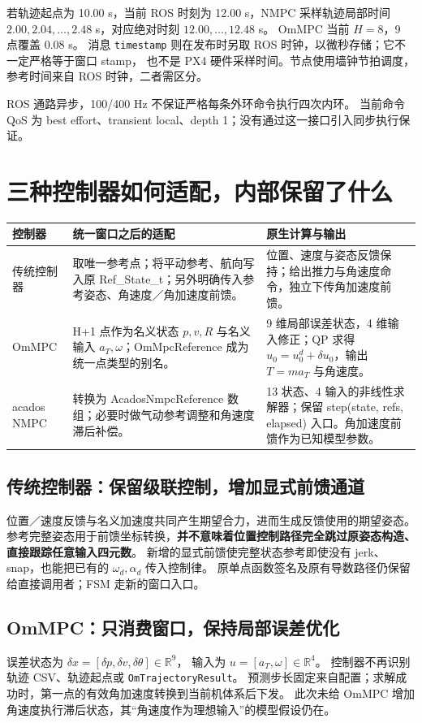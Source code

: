 \documentclass[UTF8,a4paper,11pt,fontset=fandol]{ctexart}
\newcommand{\code}[1]{{\small\nolinkurl{#1}}}
\begin{document}
若轨迹起点为 10.00 s，当前 ROS 时刻为 12.00 s，NMPC 采样轨迹局部时间
$2.00,2.04,\ldots,2.48$ s，对应绝对时刻 $12.00,\ldots,12.48$ s。
OmMPC 当前 $H=8$，9 点覆盖 0.08 s。
消息 \code{timestamp} 则在发布时另取 ROS 时钟，以微秒存储；它不一定严格等于窗口 stamp，
也不是 PX4 硬件采样时间。节点使用墙钟节拍调度，参考时间来自 ROS 时钟，二者需区分。

ROS 通路异步，100/400 Hz 不保证严格每条外环命令执行四次内环。
当前命令 QoS 为 best effort、transient local、depth 1；没有通过这一接口引入同步执行保证。
\clearpage

\section{三种控制器如何适配，内部保留了什么}
\label{sec:adapters}
\begin{table}[h!]
\centering\small
\begin{tabularx}{\linewidth}{L{2.2cm}L{4.2cm}Y}
\toprule
控制器 & 统一窗口之后的适配 & 原生计算与输出 \\\midrule
传统控制器 & 取唯一参考点；将平动参考、航向写入原 Ref\_State\_t；另外明确传入参考姿态、角速度／角加速度前馈。 & 位置、速度与姿态反馈保持；给出推力与角速度命令，独立下传角加速度前馈。\\
OmMPC & H+1 点作为名义状态 $p,v,R$ 与名义输入 $a_T,\omega$；OmMpcReference 成为统一点类型的别名。 & 9 维局部误差状态，4 维输入修正；QP 求得 $u_0=u_0^d+\delta u_0$，输出 $T=ma_T$ 与角速度。\\
acados NMPC & 转换为 AcadosNmpcReference 数组；必要时做气动参考调整和角速度滞后补偿。 & 13 状态、4 输入的非线性求解器；保留 step(state, refs, elapsed) 入口。角加速度前馈作为已知模型参数。\\
\bottomrule
\end{tabularx}
\end{table}

\subsection{传统控制器：保留级联控制，增加显式前馈通道}
位置／速度反馈与名义加速度共同产生期望合力，进而生成反馈使用的期望姿态。
参考完整姿态用于前馈坐标转换，\textbf{并不意味着位置控制路径完全跳过原姿态构造、直接跟踪任意输入四元数}。
新增的显式前馈使完整状态参考即使没有 jerk、snap，也能把已有的 $\omega_d,\alpha_d$ 传入控制律。
原单点函数签名及原有导数路径仍保留给直接调用者；FSM 走新的窗口入口。

\subsection{OmMPC：只消费窗口，保持局部误差优化}
误差状态为 $\delta x=[\delta p,\delta v,\delta\theta]\in\mathbb R^9$，
输入为 $u=[a_T,\omega]\in\mathbb R^4$。
控制器不再识别轨迹 CSV、轨迹起点或 \code{OmTrajectoryResult}。
预测步长固定来自配置；求解成功时，第一点的有效角加速度转换到当前机体系后下发。
此次未给 OmMPC 增加角速度执行滞后状态，其“角速度作为理想输入”的模型假设仍在。
\end{document}
